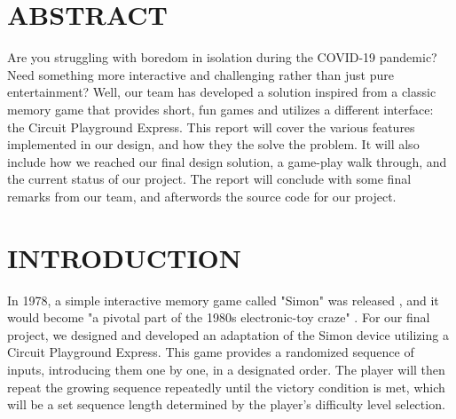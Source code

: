\documentclass[12pt]{article}
\begin{document}
\tableofcontents
\pagebreak

\section{ABSTRACT} %
Are you struggling with boredom in isolation during the COVID-19 pandemic? Need something more interactive and challenging rather than just pure entertainment? Well, our team has developed a solution inspired from a classic memory game that provides short, fun games and utilizes a different interface: the Circuit Playground Express. This report will cover the various features implemented in our design, and how they the solve the problem. It will also include how we reached our final design solution, a game-play walk through, and the current status of our project. The report will conclude with some final remarks from our team, and afterwords the source code for our project.

\section{INTRODUCTION} %

In 1978, a simple interactive memory game called "Simon" was released  \cite{Edwards}, and it would become "a pivotal part of the 1980s electronic-toy craze" \cite{Townshend}. For our final project, we designed and developed an adaptation of the Simon device utilizing a Circuit Playground Express. This game provides a randomized sequence of inputs, introducing them one by one, in a designated order. The player will then repeat the growing sequence repeatedly until the victory condition is met, which will be a set sequence length determined by the player's difficulty level selection. 
\end{document}
